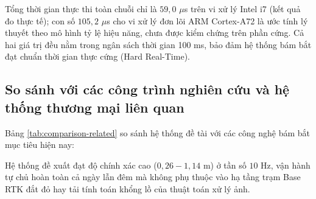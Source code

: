 Tổng thời gian thực thi toàn chuỗi chỉ là $59{,}0$ $\mu$s trên vi xử lý Intel i7 (kết quả đo thực tế); con số $105{,}2$ $\mu$s cho vi xử lý đơn lõi ARM Cortex-A72 là ước tính lý thuyết theo mô hình tỷ lệ hiệu năng, chưa được kiểm chứng trên phần cứng. Cả hai giá trị đều nằm trong ngân sách thời gian 100 ms, bảo đảm hệ thống bám bắt đạt chuẩn thời gian thực cứng (Hard Real-Time).

\subsection{So sánh với các công trình nghiên cứu và hệ thống thương mại liên quan}

\hspace{0.5cm} Bảng \ref{tab:comparison-related} so sánh hệ thống đề tài với các công nghệ bám bắt mục tiêu hiện nay:

\begin{table}[H]
\centering
\caption{Đối chuẩn kỹ thuật giữa giải pháp hợp nhất cảm biến đề xuất và các phương pháp định vị hiện hành}
\label{tab:comparison-related}
\end{table}

Hệ thống đề xuất đạt độ chính xác cao ($0{,}26 - 1{,}14$ m) ở tần số $10$ Hz, vận hành tự chủ hoàn toàn cả ngày lẫn đêm mà không phụ thuộc vào hạ tầng trạm Base RTK đắt đỏ hay tải tính toán khổng lồ của thuật toán xử lý ảnh.

